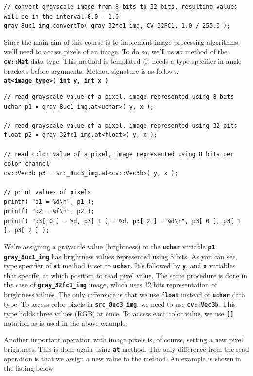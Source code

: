 \documentclass[10pt]{article}
\newcommand{\code}[1]{\textbf{\texttt{#1}}}
\newcommand{\tuchar}[0]{\code{uchar}}
\newcommand{\tfloat}{\code{float}}
\begin{document}
\begin{lstlisting}[style=CStyle,caption={Reading image.},label={lst:convertto}]
// convert grayscale image from 8 bits to 32 bits, resulting values will be in the interval 0.0 - 1.0
gray_8uc1_img.convertTo( gray_32fc1_img, CV_32FC1, 1.0 / 255.0 );
\end{lstlisting}

Since the main aim of this course is to implement image processing algorithms, we'll need to access pixels of an image.
To do so, we'll us \code{at} method of the \code{cv::Mat} data type.
This method is templated (it needs a type specifier in angle brackets before arguments. Method signature is as follows.
\\
\code{at<image\_type>( int y, int x )}

\begin{lstlisting}[style=CStyle,caption={Accessing pixels.},label={lst:pixel-access}]
// read grayscale value of a pixel, image represented using 8 bits
uchar p1 = gray_8uc1_img.at<uchar>( y, x );

// read grayscale value of a pixel, image represented using 32 bits
float p2 = gray_32fc1_img.at<float>( y, x );

// read color value of a pixel, image represented using 8 bits per color channel
cv::Vec3b p3 = src_8uc3_img.at<cv::Vec3b>( y, x );

// print values of pixels
printf( "p1 = %d\n", p1 );
printf( "p2 = %f\n", p2 );
printf( "p3[ 0 ] = %d, p3[ 1 ] = %d, p3[ 2 ] = %d\n", p3[ 0 ], p3[ 1 ], p3[ 2 ] );
\end{lstlisting}

We're assigning a grayscale value (brightness) to the \tuchar{} variable \code{p1}.
\code{gray\_8uc1\_img} has brightness values represented using 8 bits. As you can see, type specifier
of \code{at} method is set to \tuchar{}. It's followed by \code{y}, and \code{x} variables that specify,
at which position to read pixel value.
The same procedure is done in the case of \code{gray\_32fc1\_img} image, which uses 32 bits representation
of brightness values. The only difference is that we use \tfloat{} instead of \tuchar{} data type.
To access color pixels in \code{src\_8uc3\_img}, we need to use \code{cv::Vec3b}.
This type holds three values (RGB) at once. To access each color value, we use \code{[]} notation as is used
in the above example.

Another important operation with image pixels is, of course, setting a new pixel brightness.
This is done again using \code{at} method. The only difference from the read operation is that we assign
a new value to the method. An example is shown in the listing below.
\end{document}
